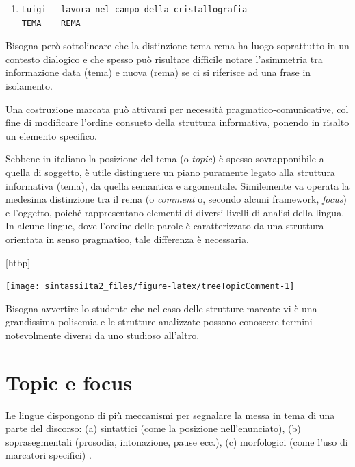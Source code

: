 \documentclass[
  a4paper,
  twoside,
  11pt,
  chapterprefix=false,
  bibliography=totocnumbered,
  listof=flat]{scrbook}
\makeatletter
\def\fps@figure{htbp}
\renewenvironment{figure}[1][\fps@figure]{
  \edef\@tempa{\noexpand\@float{figure}[#1]} 
  \@tempa
  \sffamily
}{
  \end@float
}
\makeatother
\begin{document}
\begin{enumerate}
\def\labelenumi{(\arabic{enumi})}
\setcounter{enumi}{162}
\item
\begin{verbatim}
Luigi   lavora nel campo della cristallografia
TEMA    REMA
\end{verbatim}
\end{enumerate}

Bisogna però sottolineare che la distinzione tema-rema ha luogo soprattutto in un contesto dialogico e che spesso può risultare difficile notare l'asimmetria tra informazione data (tema) e nuova (rema) se ci si riferisce ad una frase in isolamento.

Una costruzione marcata può attivarsi per necessità pragmatico-comunicative, col fine di modificare l'ordine consueto della struttura informativa, ponendo in risalto un elemento specifico.

Sebbene in italiano la posizione del tema (o \emph{topic}) è spesso sovrapponibile a quella di soggetto, è utile distinguere un piano puramente legato alla struttura informativa (tema), da quella semantica e argomentale.
Similemente va operata la medesima distinzione tra il rema (o \emph{comment} o, secondo alcuni framework, \emph{focus}) e l'oggetto, poiché rappresentano elementi di diversi livelli di analisi della lingua.
In alcune lingue, dove l'ordine delle parole è caratterizzato da una struttura orientata in senso pragmatico, tale differenza è necessaria.

\begin{figure}

{\centering \texttt{[image: sintassiIta2\_files/figure-latex/treeTopicComment-1]} 

}

\caption{Sistema topic-comment}\label{fig:treeTopicComment}
\end{figure}

Bisogna avvertire lo studente che nel caso delle strutture marcate vi è una grandissima polisemia e le strutture analizzate possono conoscere termini notevolmente diversi da uno studioso all'altro.

\hypertarget{topic-e-focus}{%
\section{Topic e focus}\label{topic-e-focus}}

Le lingue dispongono di più meccanismi per segnalare la messa in tema di una parte del discorso: (a) sintattici (come la posizione nell'enunciato), (b) soprasegmentali (prosodia, intonazione, pause ecc.), (c) morfologici (come l'uso di marcatori specifici) \citep[ 381]{simone1995}.
\end{document}
